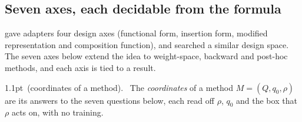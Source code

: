 \subsection{Seven axes, each decidable from the formula}\label{sec:atlas-axes}

\citet{he2021unified} gave adapters four design axes (functional form, insertion form, modified representation and
composition function), and \citet{chen2023parameter} searched a similar design space. The seven axes below extend the
idea to weight-space, backward and post-hoc methods, and each axis is tied to a result.

\makeatletter
\begin{fb@rulebox}[ochre]{1.1pt}\ {\normalfont(coordinates of a
method).}\ \upshape
The \emph{coordinates} of a method $M=(Q,q_0,\rho)$ are its answers to the seven questions below, each read off $\rho$,
$q_0$ and the box that $\rho$ acts on, with no training.
\end{fb@rulebox}
\makeatother

